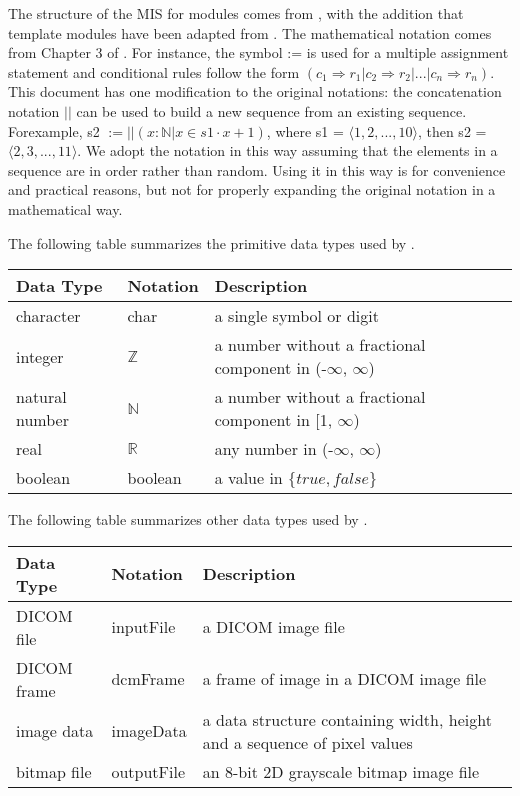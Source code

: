\documentclass[12pt, titlepage]{article}
\begin{document}
The structure of the MIS for modules comes from \citet{HoffmanAndStrooper1995},
with the addition that template modules have been adapted from
\cite{GhezziEtAl2003}.  The mathematical notation comes from Chapter 3 of
\citet{HoffmanAndStrooper1995}.  For instance, the symbol := is used for a
multiple assignment statement and conditional rules follow the form $(c_1
\Rightarrow r_1 | c_2 \Rightarrow r_2 | ... | c_n \Rightarrow r_n )$. This
document has one modification to the original notations: the concatenation
notation $||$ can be used to build a new sequence from an existing sequence.
Forexample, s2 $:= ||(x : \mathbb{N} | x \in s1 \cdot x+1)$, where s1 =
$\langle1,2,...,10 \rangle$, then s2 = $\langle 2,3,...,11 \rangle$. We adopt
the
notation in this way assuming that the elements in a sequence are in order
rather than random. Using it in this way is for convenience and practical
reasons, but not for properly expanding the original notation in a mathematical
way. 

The following table summarizes the primitive data types used by \progname. 

\begin{center}
\renewcommand{\arraystretch}{1.2}
\noindent 
\begin{tabular}{l l p{7.5cm}} 
\toprule 
\textbf{Data Type} & \textbf{Notation} & \textbf{Description}\\ 
\midrule
character & char & a single symbol or digit\\
integer & $\mathbb{Z}$ & a number without a fractional component in (-$\infty$,
$\infty$) \\
natural number & $\mathbb{N}$ & a number without a fractional component in [1,
$\infty$) \\
real & $\mathbb{R}$ & any number in (-$\infty$, $\infty$)\\
boolean & boolean & a value in $\{true, false\}$\\
\bottomrule
\end{tabular} 
\end{center}

The following table summarizes other data types used by \progname.
\begin{center}
\renewcommand{\arraystretch}{1.2}
\noindent 
\begin{tabular}{l l p{7.5cm}} 
\toprule 
\textbf{Data Type} & \textbf{Notation} & \textbf{Description}\\ 
\midrule
DICOM file & inputFile & a DICOM image file\\
DICOM frame & dcmFrame & a frame of image in a DICOM image file\\
image data & imageData & a data structure containing width, height and a
sequence of pixel values\\
bitmap file & outputFile & an 8-bit 2D grayscale bitmap image file\\
\bottomrule
\end{tabular} 
\end{center}
\end{document}
